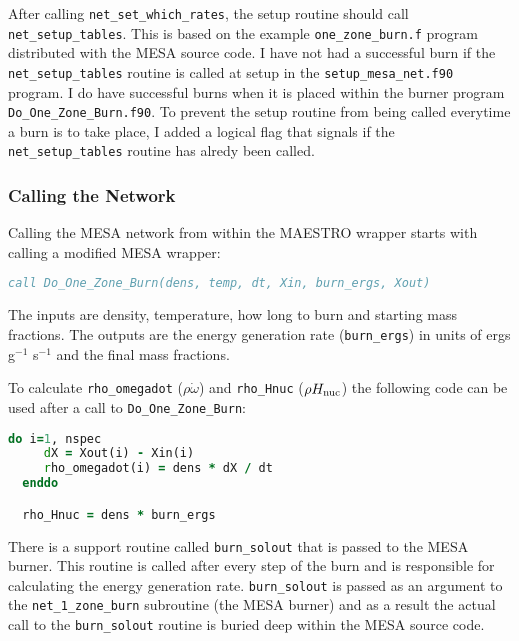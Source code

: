 After calling {\tt net\_set\_which\_rates}, the setup routine should call 
{\tt net\_setup\_tables}. This is based on the example 
{\tt one\_zone\_burn.f} program distributed with the {\sf MESA} source code. 
I have not had a successful burn if the {\tt net\_setup\_tables} routine is 
called at setup in the {\tt setup\_mesa\_net.f90} program. I do have 
successful burns when it is placed within the burner program 
{\tt Do\_One\_Zone\_Burn.f90}. To prevent the setup routine from being called 
everytime a burn is to take place, I added a logical flag that signals if the 
{\tt net\_setup\_tables} routine has alredy been called.

\subsubsection{Calling the Network}

Calling the {\sf MESA} network from within the {\sf MAESTRO} wrapper starts 
with calling a modified {\sf MESA} wrapper:
\begin{lstlisting}[language=fortran,mathescape=false]
  call Do_One_Zone_Burn(dens, temp, dt, Xin, burn_ergs, Xout)
\end{lstlisting}
The inputs are density, temperature, how long to burn and starting mass 
fractions. The outputs are the energy generation rate ({\tt burn\_ergs}) 
in units of ergs g$^{-1}$ s$^{-1}$ and the final mass fractions. 

To calculate {\tt rho\_omegadot} ($\rho \dot{\omega}$) and {\tt rho\_Hnuc} 
($\rho H_{{\rm nuc}}$) the following code can be used after a call to 
{\tt Do\_One\_Zone\_Burn}:
\begin{lstlisting}[language=fortran,mathescape=false]
  do i=1, nspec
     dX = Xout(i) - Xin(i)
     rho_omegadot(i) = dens * dX / dt
  enddo

  rho_Hnuc = dens * burn_ergs
\end{lstlisting}
There is a support routine called {\tt burn\_solout} that is passed to the 
{\sf MESA} burner. This routine is called after every step of the burn and 
is responsible for calculating the energy generation rate. {\tt burn\_solout} 
is passed as an argument to the {\tt net\_1\_zone\_burn} subroutine (the 
{\sf MESA} burner) and as a result the actual call to the {\tt burn\_solout} 
routine is buried deep within the {\sf MESA} source code.

